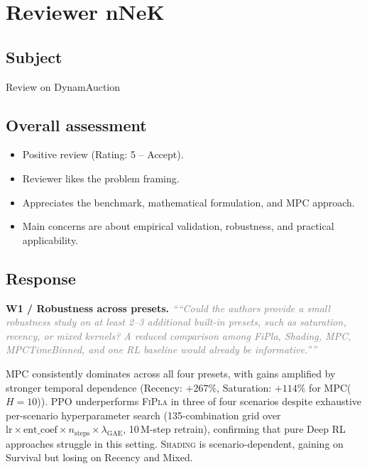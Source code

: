 \documentclass[11pt]{article}
\newcommand{\reviewer}[1]{\textit{\textcolor{gray}{``#1''}}}
\begin{document}
\section*{Reviewer nNeK}

\subsection*{Subject}
Review on DynamAuction

\subsection*{Overall assessment}

\begin{itemize}
    \item Positive review (Rating: 5 -- Accept).
    \item Reviewer likes the problem framing.
    \item Appreciates the benchmark, mathematical formulation, and MPC approach.
    \item Main concerns are about empirical validation, robustness, and practical applicability.
\end{itemize}


\subsection*{Response}


\noindent\textbf{W1 / Robustness across presets.}\quad
\reviewer{``Could the authors provide a small robustness study on at least 2--3
additional built-in presets, such as saturation, recency, or mixed kernels?
A reduced comparison among FiPla, Shading, MPC, MPCTimeBinned, and one RL
baseline would already be informative.''}

\textsc{MPC} consistently dominates across all four presets, with gains amplified by
stronger temporal dependence (Recency: $+267\%$, Saturation: $+114\%$ for
\textsc{MPC}($H{=}10$)).
\textsc{PPO} underperforms \textsc{FiPla} in three of four scenarios despite
exhaustive per-scenario hyperparameter search (135-combination grid over
$\mathrm{lr}\times\mathrm{ent\_coef}\times n_\mathrm{steps}\times\lambda_\mathrm{GAE}$,
10\,M-step retrain), confirming that pure Deep RL approaches struggle in this setting.
\textsc{Shading} is scenario-dependent, gaining on Survival but losing on Recency and Mixed.
\end{document}

